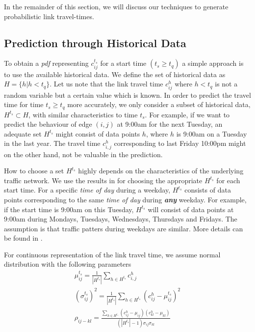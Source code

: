 In the remainder of this section, we will discuss our techniques to generate probabilistic link travel-times.

\subsection{Prediction through Historical Data}
\label{subsec:historical}
To obtain a \textit{pdf} representing $c_{ij}^{t_s}$ for a start time $(t_s \geq t_q)$ a simple approach is to use the available historical data. We define the set of historical data as $H = \{h | h < t_q\}$. Let us note that the link travel time $c_{ij}^h$ where $ h < t_q$ is not a random variable but a certain value which is known. In order to predict the travel time for time $t_s \geq t_q$ more accurately, we only consider a subset of historical data, $H^{t_s} \subset H$, with similar characteristics to time $t_s$. For example, if we want to predict the behaviour of edge $(i,j)$ at 9:00am for the next Tuesday, an adequate set $H^{t_s}$ might consist of data points $h$, where $h$ is 9:00am on a Tuesday in the last year. The travel time $c_{i,j}^h$ corresponding to last Friday 10:00pm might on the other hand, not be valuable in the prediction.

How to choose a set $H^{t_s}$ highly depends on the characteristics of the underlying traffic network. We use the results in \cite{Pan12} for choosing the appropriate $H^{t_s}$ for each start time. For a specific \textit{time of day} during a weekday, $H^{t_s}$ consists of data points corresponding to the same \textit{time of day} during \textbf{\textit{any}} weekday. For example, if the start time is 9:00am on this Tuesday, $H^{t_s}$ will consist of data points at 9:00am during Mondays, Tuesdays, Wednesdays, Thursdays and Fridays. The assumption is that traffic patters during weekdays are similar. More details can be found in \cite{Pan12}.

For continuous representation of the link travel time, we assume normal distribution with the following parameters
\begin{gather}
	\mu_{ij}^{t_s} = \frac{1}{|H^{t_s}|}\sum_{h\in H^{t_s}} c_{i,j}^h\\ 
	(\sigma_{ij}^{t_s})^2 = \frac{1}{|H^{t_s}|}\sum_{h\in H^{t_s}} (c_{ij}^h-\mu_{ij}^{t_s})^2\\
	\rho_{ij-kl} = \frac{\sum_{h\in H^{t_s}} (c_{ij}^h - \mu_{ij}) (c_{kl}^h -
	\mu_{kl})}{(|H^{t_s}|-1) \sigma_{ij} \sigma_{kl}}
\end{gather}

